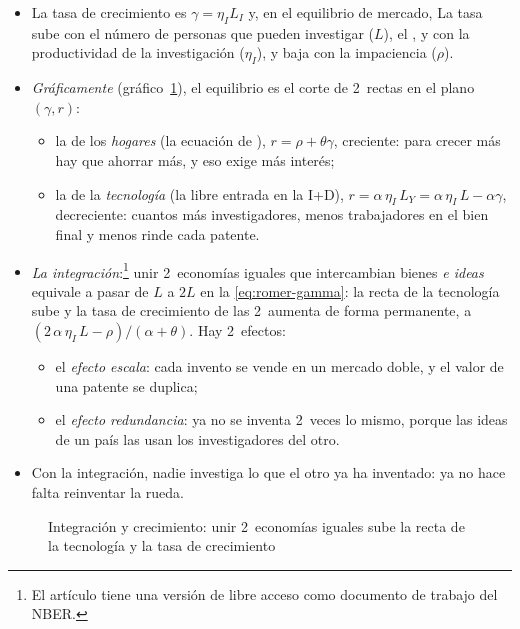 \documentclass[11pt]{article}
\begin{document}
\begin{itemize}
\item La tasa de crecimiento es $\gamma=\eta_I L_I$ y, en el equilibrio de mercado,
  La tasa sube con el número de personas que pueden investigar ($L$), el , y con la productividad de la investigación ($\eta_I$), y baja con la impaciencia ($\rho$).
\item \emph{Gráficamente} (gráfico~\ref{fig:rivera-batiz-romer}), el equilibrio es el corte de 2~rectas en el plano $(\gamma,r)$:
  \begin{itemize}
  \item la de los \emph{hogares} (la ecuación de ), $r=\rho+\theta\gamma$, creciente: para crecer más hay que ahorrar más, y eso exige más interés;
  \item la de la \emph{tecnología} (la libre entrada en la I+D), $r=\alpha\,\eta_I\,L_Y=\alpha\,\eta_I\,L-\alpha\gamma$, decreciente: cuantos más investigadores, menos trabajadores en el bien final y menos rinde cada patente.
  \end{itemize}
\item \emph{La integración}\nocite{RiveraBatizRomer1991}:\footnote{El artículo tiene una versión de libre acceso como documento de trabajo del NBER\nocite{RiveraBatizRomer1990NBER}.} unir 2~economías iguales que intercambian bienes \emph{e ideas} equivale a pasar de $L$ a $2L$ en la \eqref{eq:romer-gamma}: la recta de la tecnología sube y la tasa de crecimiento de las 2~aumenta de forma permanente, a $(2\,\alpha\,\eta_I\,L-\rho)/(\alpha+\theta)$. Hay 2~efectos:
  \begin{itemize}
  \item el \emph{efecto escala}: cada invento se vende en un mercado doble, y el valor de una patente se duplica;
  \item el \emph{efecto redundancia}: ya no se inventa 2~veces lo mismo, porque las ideas de un país las usan los investigadores del otro.
  \end{itemize}
\item Con la integración, nadie investiga lo que el otro ya ha inventado: ya no hace falta reinventar la rueda.
\end{itemize}
\begin{figure}[H]
\centering
\caption{Integración y crecimiento: unir 2~economías iguales sube la recta de la tecnología y la tasa de crecimiento}\label{fig:rivera-batiz-romer}
\end{figure}
\end{document}
